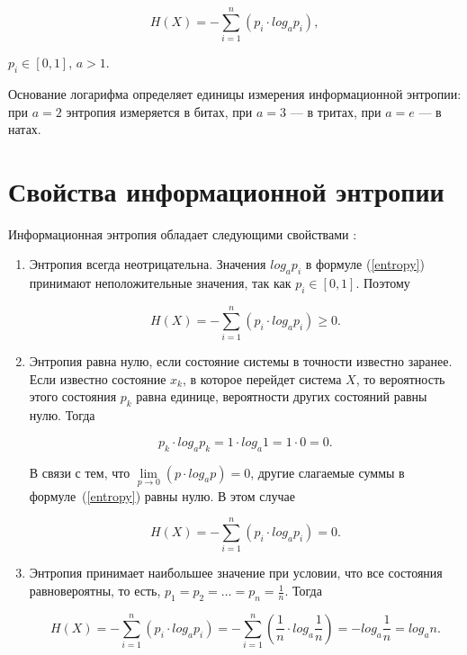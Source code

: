 \begin{equation}\label{entropy}
	H(X) = -\sum_{i = 1}^n (p_{i} \cdot log_{a}p_{i}),
\end{equation}

 $p_{i} \in [0, 1]$, $a > 1$.

Основание логарифма определяет единицы измерения информационной энтропии: при $a = 2$ энтропия измеряется в битах, при $a = 3$ --- в тритах, при $a = e$ --- в натах.

\section{Свойства информационной энтропии}\label{properties}

Информационная энтропия обладает следующими свойствами \cite{properties}:

\begin{enumerate}
	\item Энтропия всегда неотрицательна. Значения $log_{a} p_{i}$ в формуле (\ref{entropy}) принимают неположительные значения, так как $p_{i} \in [0, 1]$. Поэтому
	
\begin{equation}
	H(X) = -\sum_{i = 1}^n (p_{i} \cdot log_{a} p_{i}) \geqslant 0.
\end{equation}

	\item\label{property2} Энтропия равна нулю, если состояние системы в точности известно заранее. Если известно состояние $x_{k}$, в которое перейдет система $X$, то вероятность этого состояния $p_{k}$ равна единице, вероятности других состояний равны нулю. Тогда
	
\begin{equation}
	p_{k} \cdot log_{a} p_{k} = 1 \cdot log_{a} 1 = 1 \cdot 0 = 0.
\end{equation}

В связи с тем, что $\lim\limits_{p \to 0} (p \cdot log_{a}p) = 0$, другие слагаемые суммы в формуле~(\ref{entropy}) равны нулю. В этом случае 

\begin{equation}
	H(X) = -\sum_{i = 1}^n (p_{i} \cdot log_{a} p_{i}) = 0.
\end{equation}

	\item\label{property3} Энтропия принимает наибольшее значение при условии, что все состояния равновероятны, то есть, $p_{1} = p_{2} = \ldots = p_{n} = \frac{1}{n}$. Тогда
	
\begin{equation}
	H(X) = -\sum_{i = 1}^n (p_{i} \cdot log_{a} p_{i}) = -\sum_{i = 1}^n (\frac{1}{n} \cdot log_{a} \frac{1}{n}) = -log_{a} \frac{1}{n} = log_{a} n.
\end{equation}
	
\end{enumerate}

